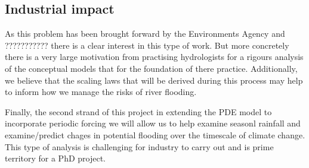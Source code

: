 \documentclass[11pt]{article}
\begin{document}
\subsection{Industrial impact}
As this problem has been brought forward by the Environments Agency and ??????????? there is a clear interest in this type of work. But more concretely there is a very large motivation from practising hydrologists for a rigours analysis of the conceptual models that for the foundation of there practice. Additionally, we believe that the scaling laws that will be derived during this process may help to inform how we manage the risks of river flooding.

Finally, the second strand of this project in extending the PDE model to incorporate periodic forcing we will allow us to help examine seasonl rainfall and examine/predict chages in potential flooding over the timescale of climate change. This type of analysis is challenging for industry to carry out and is prime territory for a PhD project.




\printbibliography
\end{document}
